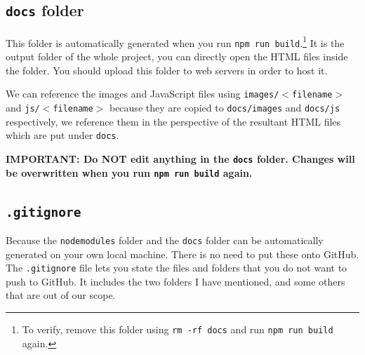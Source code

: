 \subsection{\texttt{docs} folder}
\label{sec:docs}

This folder is automatically generated when you run \texttt{npm run build}.\footnote{To verify, remove this folder using \texttt{rm -rf docs} and run \texttt{npm run build} again.} It is the output folder of the whole project, you can directly open the HTML files inside the folder. You should upload this folder to web servers in order to host it.

We can reference the images and JavaScript files using \texttt{images/$<$filename$>$} and \texttt{js/$<$filename$>$} because they are copied to \texttt{docs/images} and \texttt{docs/js} respectively, we reference them in the perspective of the resultant HTML files which are put under \texttt{docs}.
\vspace{6mm}

\textbf{IMPORTANT: Do NOT edit anything in the \texttt{docs} folder. Changes will be overwritten when you run \texttt{npm run build} again.}

\subsection{\texttt{.gitignore}}
\label{sec:gitignore}

Because the \texttt{node\textunderscore modules} folder and the \texttt{docs} folder can be automatically generated on your own local machine. There is no need to put these onto GitHub. The \texttt{.gitignore} file lets you state the files and folders that you do not want to push to GitHub. It includes the two folders I have mentioned, and some others that are out of our scope.

